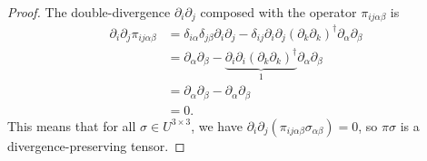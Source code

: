 \documentclass[preprint,twocolumn,5p]{elsarticle}
\begin{document}
\begin{proof}
    The double-divergence $\partial_i \partial_j$ composed with the operator
    $\pi_{i j \alpha \beta}$ is
    \begin{equation}
    \begin{split}
        \partial_i \partial_j \pi_{i j \alpha \beta}
        & = \delta_{i \alpha} \delta_{j \beta} \partial_i \partial_j
        - \delta_{i j} \partial_i \partial_j
        \left( \partial_k \partial_k \right)^{\dagger}
        \partial_\alpha \partial_\beta \\
        & = \partial_\alpha \partial_\beta
        - \underbrace{\partial_i \partial_i
        \left( \partial_k \partial_k \right)^{\dagger}}_{1}
        \partial_\alpha \partial_\beta \\
        & = \partial_\alpha \partial_\beta - \partial_\alpha \partial_\beta \\
        & = 0.
    \end{split}
    \end{equation}
    This means that for all $\sigma \in U^{3 \times 3}$, we have
    $\partial_i \partial_j ( \pi_{i j \alpha \beta} \sigma_{\alpha \beta} ) = 0$,
    so $\pi \sigma$ is a divergence-preserving
    tensor.


\end{proof}
\end{document}
